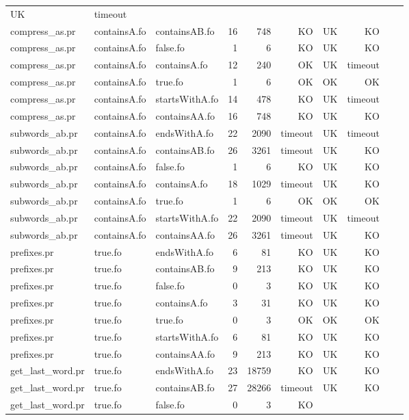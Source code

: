 \begin{tabular}{l|l|l|r|r|r|r|r|r|r}
UK & timeout \\
compress\_as.pr & containsA.fo & containsAB.fo & 16 & 748 & KO & 
UK & KO \\
compress\_as.pr & containsA.fo & false.fo & 1 & 6 & KO & 
UK & KO \\
compress\_as.pr & containsA.fo & containsA.fo & 12 & 240 & OK & 
UK & timeout \\
compress\_as.pr & containsA.fo & true.fo & 1 & 6 & OK & 
OK & OK \\
compress\_as.pr & containsA.fo & startsWithA.fo & 14 & 478 & KO & 
UK & timeout \\
compress\_as.pr & containsA.fo & containsAA.fo & 16 & 748 & KO & 
UK & KO \\
subwords\_ab.pr & containsA.fo & endsWithA.fo & 22 & 2090 & timeout & 
UK & timeout \\
subwords\_ab.pr & containsA.fo & containsAB.fo & 26 & 3261 & timeout & 
UK & KO \\
subwords\_ab.pr & containsA.fo & false.fo & 1 & 6 & KO & 
UK & KO \\
subwords\_ab.pr & containsA.fo & containsA.fo & 18 & 1029 & timeout & 
UK & KO \\
subwords\_ab.pr & containsA.fo & true.fo & 1 & 6 & OK & 
OK & OK \\
subwords\_ab.pr & containsA.fo & startsWithA.fo & 22 & 2090 & timeout & 
UK & timeout \\
subwords\_ab.pr & containsA.fo & containsAA.fo & 26 & 3261 & timeout & 
UK & KO \\
prefixes.pr & true.fo & endsWithA.fo & 6 & 81 & KO & 
UK & KO \\
prefixes.pr & true.fo & containsAB.fo & 9 & 213 & KO & 
UK & KO \\
prefixes.pr & true.fo & false.fo & 0 & 3 & KO & 
UK & KO \\
prefixes.pr & true.fo & containsA.fo & 3 & 31 & KO & 
UK & KO \\
prefixes.pr & true.fo & true.fo & 0 & 3 & OK & 
OK & OK \\
prefixes.pr & true.fo & startsWithA.fo & 6 & 81 & KO & 
UK & KO \\
prefixes.pr & true.fo & containsAA.fo & 9 & 213 & KO & 
UK & KO \\
get\_last\_word.pr & true.fo & endsWithA.fo & 23 & 18759 & KO & 
UK & KO \\
get\_last\_word.pr & true.fo & containsAB.fo & 27 & 28266 & timeout & 
UK & KO \\
get\_last\_word.pr & true.fo & false.fo & 0 & 3 & KO & 

\end{tabular}
